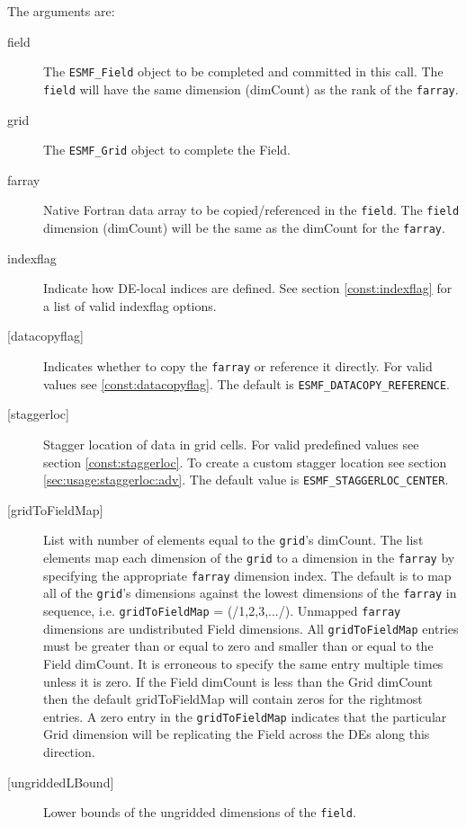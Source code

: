    The arguments are: 
   \begin{description} 
   \item [field] 
   The {\tt ESMF\_Field} object to be completed and 
   committed in this call. The {\tt field} will have the same dimension 
   (dimCount) as the rank of the {\tt farray}. 
   \item [grid] 
   The {\tt ESMF\_Grid} object to complete the Field. 
   \item [farray] 
   Native Fortran data array to be copied/referenced in the {\tt field}. 
   The {\tt field} dimension (dimCount) will be the same as the dimCount 
   for the {\tt farray}. 
   \item [indexflag] 
   Indicate how DE-local indices are defined. See section 
   \ref{const:indexflag} for a list of valid indexflag options. 
   \item [{[datacopyflag]}] 
   Indicates whether to copy the {\tt farray} or reference it directly. 
   For valid values see \ref{const:datacopyflag}. The default is 
   {\tt ESMF\_DATACOPY\_REFERENCE}. 
   \item [{[staggerloc]}] 
   Stagger location of data in grid cells. For valid 
   predefined values see section \ref{const:staggerloc}. 
   To create a custom stagger location see section 
   \ref{sec:usage:staggerloc:adv}. The default 
   value is {\tt ESMF\_STAGGERLOC\_CENTER}. 
   \item [{[gridToFieldMap]}] 
   List with number of elements equal to the 
   {\tt grid}'s dimCount. The list elements map each dimension 
   of the {\tt grid} to a dimension in the {\tt farray} by 
   specifying the appropriate {\tt farray} dimension index. The 
   default is to map all of the {\tt grid}'s dimensions against the 
   lowest dimensions of the {\tt farray} in sequence, i.e. 
   {\tt gridToFieldMap} = (/1,2,3,.../). 
   Unmapped {\tt farray} dimensions are undistributed Field 
   dimensions. 
   All {\tt gridToFieldMap} entries must be greater than or equal 
   to zero and smaller than or equal to the Field dimCount. It is erroneous 
   to specify the same entry multiple times unless it is zero. 
   If the Field dimCount is less than the Grid dimCount then the default 
   gridToFieldMap will contain zeros for the rightmost entries. A zero 
   entry in the {\tt gridToFieldMap} indicates that the particular 
   Grid dimension will be replicating the Field across the DEs along 
   this direction. 
   \item [{[ungriddedLBound]}] 
   Lower bounds of the ungridded dimensions of the {\tt field}. 

\end{description}
